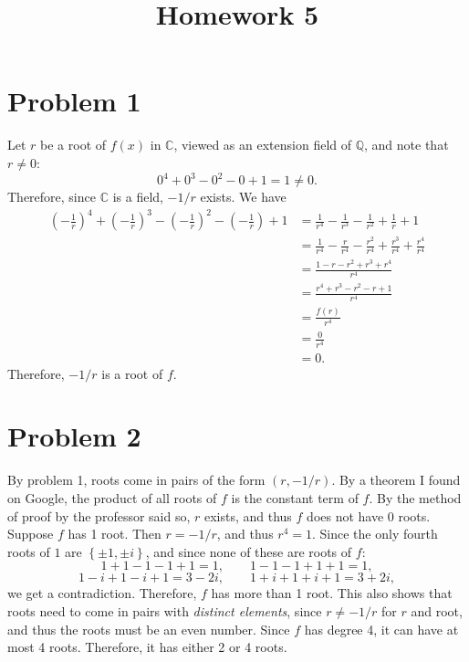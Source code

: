 \documentclass[11pt, letterpaper]{article}
\title{Homework 5}
\begin{document}
\makeproblem
\section*{Problem 1}
Let $r$ be a root of $f(x)$ in $\mathbb{C} $, viewed as an extension field of $\mathbb{Q} $, and note that $r\neq 0$:
\[
	0^4+0^3-0^2-0+1=1\neq 0
.\]
Therefore, since $\mathbb{C} $ is a field, $-1/r$ exists. We have
\begin{align*}
	\left( -\frac{1}{r}  \right) ^4+\left( -\frac{1}{r}  \right) ^3-\left( -\frac{1}{r}  \right) ^2-\left( -\frac{1}{r}  \right) +1&=\frac{1}{r^4} -\frac{1}{r^3} -\frac{1}{r^2} +\frac{1}{r} +1\\
																       &=\frac{1}{r^4} -\frac{r}{r^4} -\frac{r^2}{r^4} +\frac{r^3}{r^4} +\frac{r^4}{r^4} \\
																       &=\frac{1-r-r^2+r^3+r^4}{r^4} \\
																       &=\frac{r^4+r^3-r^2-r+1}{r^4} \\
																       &=\frac{f(r)}{r^4} \\
																       &=\frac{0}{r^4} \\
																       &=0
.\end{align*}
Therefore, $-1/r$ is a root of $f$.
\section*{Problem 2}
By problem 1, roots come in pairs of the form $(r,-1/r)$. By a theorem I found on Google, the product of all roots of $f$ is the constant term of $f$. By the method of proof by the professor said so, $r$ exists, and thus $f$ does not have 0 roots. Suppose $f$ has 1 root. Then $r=-1/r$, and thus $r^4=1$. Since the only fourth roots of $1$ are $\left\{ \pm 1,\pm i \right\} $, and since none of these are roots of $f$:
\[
	1+1-1-1+1=1,\qquad 1-1-1+1+1=1,
\]
\[
	1-i+1-i+1=3-2i,\qquad 1+i+1+i+1=3+2i
,\]
we get a contradiction. Therefore, $f$ has more than 1 root. This also shows that roots need to come in pairs with \emph{distinct elements}, since $r\neq -1/r$ for $r$ and root, and thus the roots must be an even number. Since $f$ has degree 4, it can have at most 4 roots. Therefore, it has either 2 or 4 roots.
\end{document}
